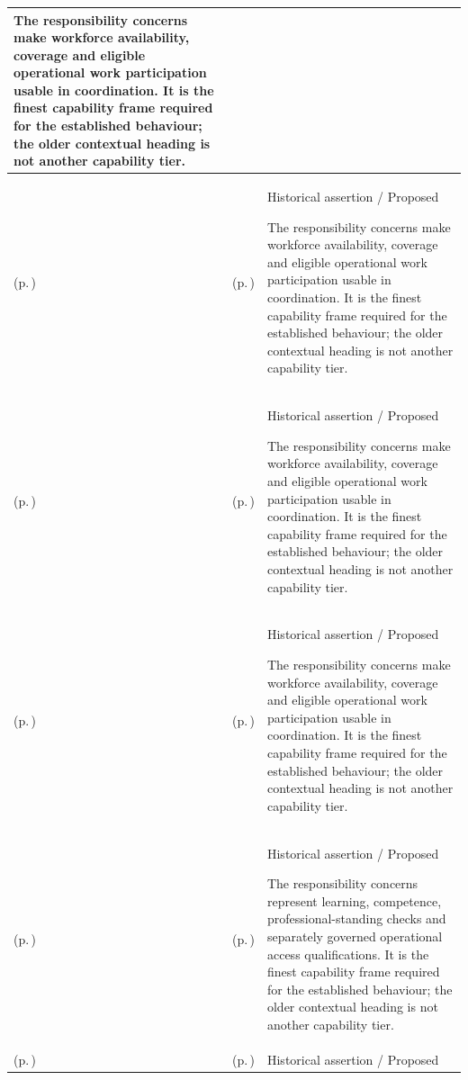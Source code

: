 \begin{longtable}{|>{\raggedright\arraybackslash}p{0.27\TableWidth}|>{\raggedright\arraybackslash}p{0.27\TableWidth}|>{\raggedright\arraybackslash}p{0.46\TableWidth}|}
The responsibility concerns make workforce availability, coverage and eligible operational work participation usable in coordination. It is the finest capability frame required for the established behaviour; the older contextual heading is not another capability tier.\\\hline
\nameref{cap:bec-operational-workforce-coordination} (p.\,\pageref{cap:bec-operational-workforce-coordination}) & \nameref{cap:bec-mobile-staff-management} (p.\,\pageref{cap:bec-mobile-staff-management}) & Historical assertion / Proposed

The responsibility concerns make workforce availability, coverage and eligible operational work participation usable in coordination. It is the finest capability frame required for the established behaviour; the older contextual heading is not another capability tier.\\\hline
\nameref{cap:bec-operational-workforce-coordination} (p.\,\pageref{cap:bec-operational-workforce-coordination}) & \nameref{cap:bec-on-call-management} (p.\,\pageref{cap:bec-on-call-management}) & Historical assertion / Proposed

The responsibility concerns make workforce availability, coverage and eligible operational work participation usable in coordination. It is the finest capability frame required for the established behaviour; the older contextual heading is not another capability tier.\\\hline
\nameref{cap:bec-operational-workforce-coordination} (p.\,\pageref{cap:bec-operational-workforce-coordination}) & \nameref{cap:bec-work-allocation-dispatch} (p.\,\pageref{cap:bec-work-allocation-dispatch}) & Historical assertion / Proposed

The responsibility concerns make workforce availability, coverage and eligible operational work participation usable in coordination. It is the finest capability frame required for the established behaviour; the older contextual heading is not another capability tier.\\\hline
\nameref{cap:bec-workforce-qualification-development-enablement} (p.\,\pageref{cap:bec-workforce-qualification-development-enablement}) & \nameref{cap:bec-clinical-training-education} (p.\,\pageref{cap:bec-clinical-training-education}) & Historical assertion / Proposed

The responsibility concerns represent learning, competence, professional-standing checks and separately governed operational access qualifications. It is the finest capability frame required for the established behaviour; the older contextual heading is not another capability tier.\\\hline
\nameref{cap:bec-workforce-qualification-development-enablement} (p.\,\pageref{cap:bec-workforce-qualification-development-enablement}) & \nameref{cap:bec-clinical-competency-management} (p.\,\pageref{cap:bec-clinical-competency-management}) & Historical assertion / Proposed


\end{longtable}
